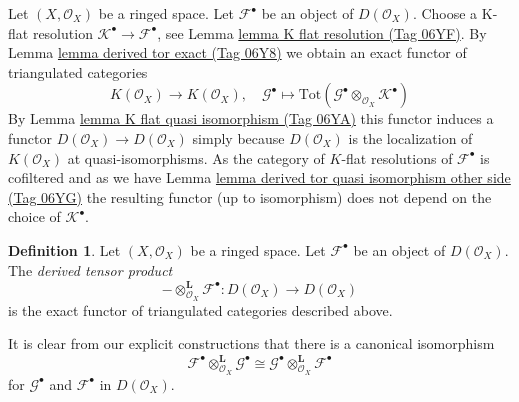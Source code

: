 \documentclass{amsart}
\theoremstyle{plain}
\theoremstyle{definition}
\newtheorem{definition}[subsection]{Definition}
\theoremstyle{remark}
\numberwithin{equation}{subsection}
\begin{document}
\noindent
Let $(X, \mathcal{O}_X)$ be a ringed space.
Let $\mathcal{F}^\bullet$ be an object of $D(\mathcal{O}_X)$.
Choose a K-flat resolution $\mathcal{K}^\bullet \to \mathcal{F}^\bullet$, see
Lemma \href{https://stacks.math.columbia.edu/tag/06YF}{lemma K flat resolution (Tag 06YF)}.
By
Lemma \href{https://stacks.math.columbia.edu/tag/06Y8}{lemma derived tor exact (Tag 06Y8)}
we obtain an exact functor of triangulated categories
$$
K(\mathcal{O}_X)
\longrightarrow
K(\mathcal{O}_X),
\quad
\mathcal{G}^\bullet
\longmapsto
\text{Tot}(\mathcal{G}^\bullet \otimes_{\mathcal{O}_X} \mathcal{K}^\bullet)
$$
By
Lemma \href{https://stacks.math.columbia.edu/tag/06YA}{lemma K flat quasi isomorphism (Tag 06YA)}
this functor induces a functor
$D(\mathcal{O}_X) \to D(\mathcal{O}_X)$ simply because
$D(\mathcal{O}_X)$ is the localization of $K(\mathcal{O}_X)$
at quasi-isomorphisms. As the category of $K$-flat resolutions
of $\mathcal{F}^\bullet$ is cofiltered and as we have
Lemma \href{https://stacks.math.columbia.edu/tag/06YG}{lemma derived tor quasi isomorphism other side (Tag 06YG)}
the resulting functor (up to isomorphism)
does not depend on the choice of $\mathcal{K}^\bullet$.

\begin{definition}
\label{cohomology-definition-derived-tor}
Let $(X, \mathcal{O}_X)$ be a ringed space.
Let $\mathcal{F}^\bullet$ be an object of $D(\mathcal{O}_X)$.
The {\it derived tensor product}
$$
- \otimes_{\mathcal{O}_X}^{\mathbf{L}} \mathcal{F}^\bullet :
D(\mathcal{O}_X)
\longrightarrow
D(\mathcal{O}_X)
$$
is the exact functor of triangulated categories described above.
\end{definition}

\noindent
It is clear from our explicit constructions that
there is a canonical isomorphism
$$
\mathcal{F}^\bullet \otimes_{\mathcal{O}_X}^{\mathbf{L}} \mathcal{G}^\bullet
\cong
\mathcal{G}^\bullet \otimes_{\mathcal{O}_X}^{\mathbf{L}} \mathcal{F}^\bullet
$$
for $\mathcal{G}^\bullet$ and $\mathcal{F}^\bullet$ in $D(\mathcal{O}_X)$.
\end{document}
